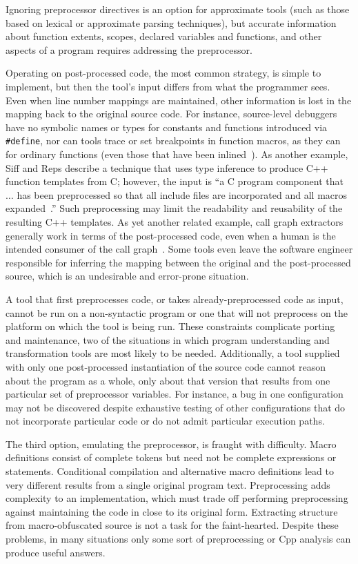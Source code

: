 \documentclass[11pt]{article}
\begin{document}
Ignoring preprocessor directives is an option for approximate tools (such
as those based on lexical or approximate parsing techniques), but accurate
information about function extents, scopes, declared variables and
functions, and other aspects of a program requires addressing the
preprocessor.

Operating on post-processed code, the most common strategy, is simple to
implement, but then the tool's input differs from what the
programmer sees.  Even when line number mappings are maintained, other
information is lost in the mapping back to the original source code.
For instance, source-level debuggers have no symbolic names or types
for constants and functions introduced via {\tt \#define}, nor can tools
trace or set breakpoints in function macros, as they can for ordinary
functions (even those that have been inlined~\cite{Zellweger83:TR}).
As another example, Siff
and Reps describe a technique that uses type inference to produce
C++ function templates from C; however, the input is ``a C program
component that $\ldots$ has been preprocessed so that all include
files are incorporated and all macros
expanded~\cite[p.~145]{Siff-fse96}.''  Such preprocessing may limit
the readability and reusability of the resulting C++ templates.  As
yet another related example, call graph extractors generally work in
terms of the post-processed code, even when a human is the intended
consumer of the call graph~\cite{Murphy-icse18}.  Some tools even
leave the software engineer responsible for inferring the mapping between the
original and the post-processed source, which is an undesirable and
error-prone situation.

A tool that first preprocesses code, or takes already-preprocessed code as
input, cannot be run on a non-syntactic program or one that will not
preprocess on the platform on which the tool is being run.  These
constraints complicate porting and maintenance, two of the situations in
which program understanding and transformation tools are most likely to be
needed.  Additionally, a tool supplied with only one post-processed
instantiation of the source code cannot reason about the program as a
whole, only about that version that results from one particular set of
preprocessor variables.  For instance, a bug in one configuration may not
be discovered despite exhaustive testing of other configurations that do
not incorporate particular code or do not admit particular execution paths.

The third option, emulating the preprocessor, is fraught with difficulty.
Macro definitions consist of complete tokens but need not be complete
expressions or statements.  Conditional compilation and alternative macro
definitions lead to very different results from a single original program
text.  Preprocessing adds complexity to an implementation, which must trade
off performing preprocessing against maintaining the code in close to its
original form.  Extracting structure from macro-obfuscated source is not a
task for the faint-hearted.  Despite these problems, in many situations
only some sort of preprocessing or Cpp analysis can produce useful answers.
\end{document}
